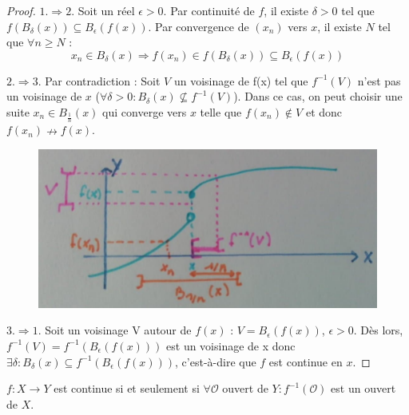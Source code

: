 \begin{proof}

    $1.\Rightarrow2.$ Soit un réel $\epsilon>0$. Par continuité de $f$, il existe $\delta>0$ tel que $f(B_\delta(x))\subseteq B_\epsilon(f(x))$. Par convergence de $(x_n)$ vers $x$, il existe $N$ tel que $\forall n\geq N$ :
    \begin{equation*}
        x_n\in B_\delta(x) \Rightarrow f(x_n)\in f(B_\delta(x)) \subseteq B_\epsilon(f(x))
    \end{equation*}
    
    $2.\Rightarrow3.$ Par contradiction : Soit $V$ un voisinage de f(x) tel que $f^{-1}(V)$ n'est pas un voisinage de $x$ ($\forall \delta > 0: B_\delta(x) \not\subseteq f^{-1}(V)$). Dans ce cas, on peut choisir une suite $x_n \in B_{\frac{1}{n}}(x)$ qui converge vers $x$ telle que $f(x_n) \notin V$ et donc $f(x_n) \nrightarrow f(x)$.\\
    \begin{figure}[H]
        \centering
        \includegraphics[scale = 0.2]{synthese_continuite_theo.jpg}
    \end{figure}
    
    $3.\Rightarrow1.$ Soit un voisinage V autour de $f(x)$ : $V = B_\epsilon(f(x))$, $\epsilon > 0$. Dès lors, $f^{-1}(V) = f^{-1}(B_\epsilon(f(x)))$ est un voisinage de x donc $\exists\delta : B_\delta(x)\subseteq f^{-1}(B_\epsilon(f(x)))$, c'est-à-dire que $f$ est continue en $x$.
\end{proof}

\begin{remark}
	$f:X\rightarrow Y$ est continue si et seulement si $\forall \mathcal{O}$ ouvert de $Y:f^{-1}(\mathcal{O})$ est un ouvert de $X$.
\end{remark}


